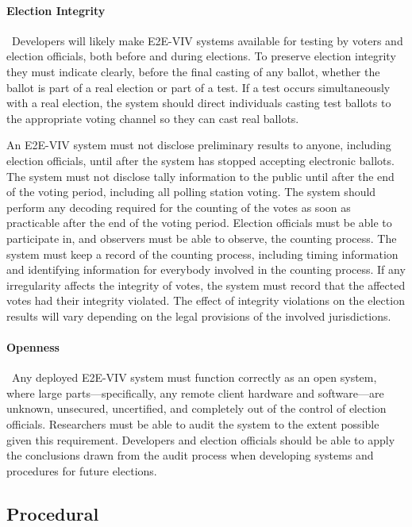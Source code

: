 \paragraph{Election Integrity} \ Developers will likely make E2E-VIV
systems available for testing by voters and election officials, both
before and during elections. To preserve election integrity they must
indicate clearly, before the final casting of any ballot, whether the
ballot is part of a real election or part of a test. If a test occurs
simultaneously with a real election, the system should direct
individuals casting test ballots to the appropriate voting channel so
they can cast real ballots.

An E2E-VIV system must not disclose preliminary results to anyone,
including election officials, until after the system has stopped
accepting electronic ballots. The system must not disclose tally
information to the public until after the end of the voting period,
including all polling station voting. The system should perform any
decoding required for the counting of the votes as soon as practicable
after the end of the voting period. Election officials must be able to
participate in, and observers must be able to observe, the counting
process. The system must keep a record of the counting process,
including timing information and identifying information for everybody
involved in the counting process. If any irregularity affects the
integrity of votes, the system must record that the affected votes had
their integrity violated. The effect of integrity violations on the
election results will vary depending on the legal provisions of the
involved jurisdictions.

\paragraph{Openness} \ Any deployed E2E-VIV system must function
correctly as an open system, where large parts---specifically, any
remote client hardware and software---are unknown, unsecured,
uncertified, and completely out of the control of election
officials. Researchers must be able to audit the system to the extent
possible given this requirement. Developers and election officials
should be able to apply the conclusions drawn from the audit process
when developing systems and procedures for future elections.

\subsection{Procedural}

